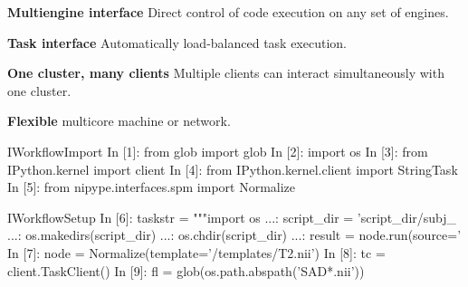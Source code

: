 \documentclass[portrait,final]{baposter}
\newcommand{\compresslist}{%
\setlength{\itemsep}{1pt}%
\setlength{\parskip}{0pt}%
\setlength{\parsep}{0pt}%
}
\begin{document}
\begin{poster}
{    \begin{center}
    \end{center}

    \begin{list}{}{\leftmargin=1em}
      \compresslist
    \item \textbf{Multiengine interface} Direct control of code execution on
      any set of engines.
    \item \textbf{Task interface} Automatically load-balanced task execution.
    \item \textbf{One cluster, many clients} Multiple clients can interact
      simultaneously with one cluster.
    \item \textbf{Flexible} multicore machine or network.
   \end{list}

    
\vspace{-0.3em}
  }

\begin{SaveVerbatim}{IWorkflowImport}
In [1]: from glob import glob
In [2]: import os
In [3]: from IPython.kernel import client
In [4]: from IPython.kernel.client import StringTask
In [5]: from nipype.interfaces.spm import Normalize
\end{SaveVerbatim}

\begin{SaveVerbatim}{IWorkflowSetup}
In [6]: taskstr = """import os
   ...: script_dir = 'script_dir/subj_%
   ...: os.makedirs(script_dir)
   ...: os.chdir(script_dir)
   ...: result = node.run(source='%
In [7]: node = Normalize(template='/templates/T2.nii')
In [8]: tc = client.TaskClient()
In [9]: fl = glob(os.path.abspath('SAD*.nii'))
\end{SaveVerbatim}


\end{poster}
\end{document}
